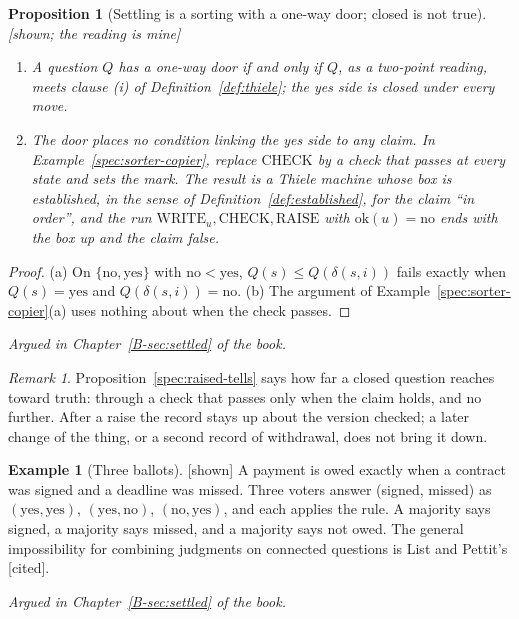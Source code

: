 \documentclass[11pt, a4paper]{article}
\theoremstyle{plain}
\newtheorem{proposition}[theorem]{Proposition}
\theoremstyle{definition}
\newtheorem{example}[theorem]{Example}
\theoremstyle{remark}
\newtheorem{remark}[theorem]{Remark}
\newcommand{\Bool}{\{\mathrm{no},\mathrm{yes}\}}
\newcommand{\step}{\delta}
\newcommand{\argued}[1]{\par\noindent\textit{Argued in Chapter~\ref{B-#1} of the book.}\par}
\newcommand{\kind}[1]{\textup{[#1]}}
\begin{document}
\begin{proposition}[Settling is a sorting with a one-way door; closed is not true]\label{spec:settled}
\kind{shown; the reading is mine}
\begin{enumerate}[label=(\alph*)]
\item A question $Q$ has a one-way door if and only if $Q$, as a two-point reading, meets clause (i) of
Definition~\ref{def:thiele}; the yes side is closed under every move.
\item The door places no condition linking the yes side to any claim. In
Example~\ref{spec:sorter-copier}, replace $\mathrm{CHECK}$ by a check that passes at every state and sets the
mark. The result is a Thiele machine whose box is established, in the sense of
Definition~\ref{def:established}, for the claim ``in order'', and the run
$\mathrm{WRITE}_u,\mathrm{CHECK},\mathrm{RAISE}$ with $\mathrm{ok}(u)=\mathrm{no}$ ends with the box up and the
claim false.
\end{enumerate}
\end{proposition}
\begin{proof}
(a) On $\Bool$ with $\mathrm{no}<\mathrm{yes}$, $Q(s)\le Q(\step(s,i))$ fails exactly when $Q(s)=\mathrm{yes}$
and $Q(\step(s,i))=\mathrm{no}$. (b) The argument of Example~\ref{spec:sorter-copier}(a) uses nothing about
when the check passes.
\end{proof}
\argued{sec:settled}

\begin{remark}
Proposition~\ref{spec:raised-tells} says how far a closed question reaches toward truth: through a check
that passes only when the claim holds, and no further. After a raise the record stays up about the version
checked; a later change of the thing, or a second record of withdrawal, does not bring it down.
\end{remark}

\begin{example}[Three ballots]\label{spec:ballots} \kind{shown}
A payment is owed exactly when a contract was signed and a deadline was missed. Three voters answer (signed,
missed) as $(\mathrm{yes},\mathrm{yes})$, $(\mathrm{yes},\mathrm{no})$, $(\mathrm{no},\mathrm{yes})$, and each
applies the rule. A majority says signed, a majority says missed, and a majority says not owed. The general
impossibility for combining judgments on connected questions is List and Pettit's \kind{cited}.
\end{example}
\argued{sec:settled}
\end{document}
